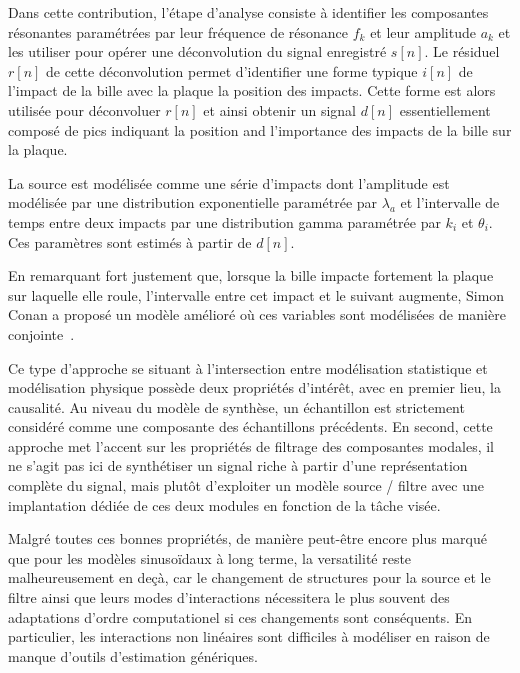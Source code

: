 Dans cette contribution, l'étape d'analyse consiste à identifier les composantes résonantes paramétrées par leur fréquence de résonance $f_k$ et leur amplitude $a_k$ et les utiliser pour opérer une déconvolution du signal enregistré $s[n]$. Le résiduel $r[n]$ de cette déconvolution  permet d'identifier une forme typique $i[n]$ de l'impact de la bille avec la plaque la position des impacts. Cette forme est alors utilisée pour déconvoluer $r[n]$ et ainsi obtenir un signal $d[n]$ essentiellement composé de pics indiquant la position and l'importance des impacts de la bille sur la plaque.

La source est modélisée comme une série d'impacts dont l'amplitude est modélisée par une distribution exponentielle paramétrée par $\lambda_a$  et l'intervalle de temps entre deux impacts par une distribution gamma paramétrée par $k_i$ et $\theta_i$. Ces paramètres sont estimés à partir de $d[n]$.

En remarquant fort justement que, lorsque la bille impacte fortement la plaque sur laquelle elle roule, l'intervalle entre cet impact et le suivant augmente, Simon Conan a proposé un modèle amélioré où ces variables sont modélisées de manière conjointe~\cite{conan2014synthesis}.

Ce type d'approche se situant à l'intersection entre modélisation statistique et modélisation physique possède deux propriétés d'intérêt, avec en premier lieu, la causalité. Au niveau du modèle de synthèse, un échantillon est strictement considéré comme une composante des échantillons précédents. En second, cette approche met l'accent sur les propriétés de filtrage des composantes modales, il ne s'agit pas ici de synthétiser un signal riche à partir d'une représentation complète du signal, mais plutôt d'exploiter un modèle source / filtre avec une implantation dédiée de ces deux modules en fonction de la tâche visée.


Malgré toutes ces bonnes propriétés, de manière peut-être encore plus marqué que pour les modèles sinusoïdaux à long terme, la versatilité reste malheureusement en deçà, car le changement de structures pour la source et le filtre ainsi que leurs modes d'interactions nécessitera le plus souvent des adaptations d'ordre computationel si ces changements sont conséquents. En particulier, les interactions non linéaires sont difficiles à modéliser en raison de manque d'outils d'estimation génériques.

